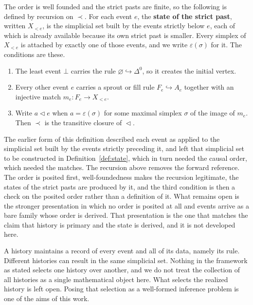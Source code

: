 The order is well founded and the strict pasts are finite, so the following is defined by recursion on $\prec$.
For each event $e$, the \textbf{state of the strict past}, written $X_{<e}$, is the simplicial set built by the events strictly below $e$, each of which is already available because its own strict past is smaller.
Every simplex of $X_{<e}$ is attached by exactly one of those events, and we write $\varepsilon(\sigma)$ for it.
The conditions are these.

\begin{enumerate}
  \item The least event $\bot$ carries the rule $\varnothing \hookrightarrow \Delta^0$, so it creates the initial vertex.
  \item Every other event $e$ carries a sprout or fill rule $F_e \hookrightarrow A_e$ together with an injective match $m_e : F_e \to X_{<e}$.
  \item Write $a \vartriangleleft e$ when $a = \varepsilon(\sigma)$ for some maximal simplex $\sigma$ of the image of $m_e$. Then $\prec$ is the transitive closure of $\vartriangleleft$.
\end{enumerate}


\begin{remark}
\label{rem:recursion}
The earlier form of this definition described each event as applied to the simplicial set built by the events strictly preceding it, and left that simplicial set to be constructed in Definition~\ref{def:state}, which in turn needed the causal order, which needed the matches.
The recursion above removes the forward reference.
The order is posited first, well-foundedness makes the recursion legitimate, the states of the strict pasts are produced by it, and the third condition is then a check on the posited order rather than a definition of it.
What remains open is the stronger presentation in which no order is posited at all and events arrive as a bare family whose order is derived.
That presentation is the one that matches the claim that history is primary and the state is derived, and it is not developed here.
\end{remark}

A history maintains a record of every event and all of its data, namely its rule.
Different histories can result in the same simplicial set.
Nothing in the framework as stated selects one history over another, and we do not treat the collection of all histories as a single mathematical object here.
What selects the realized history is left open.
Posing that selection as a well-formed inference problem is one of the aims of this work.

